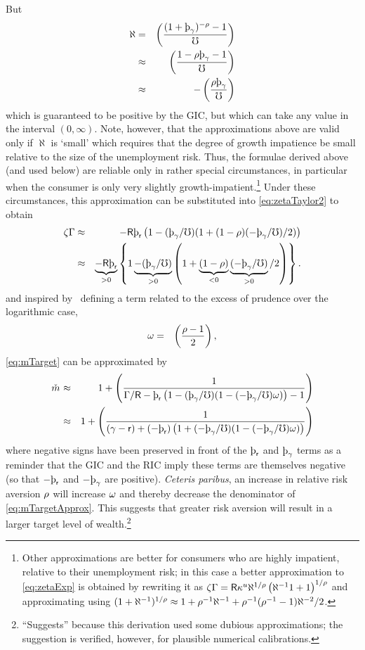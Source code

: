 \message{ !name(TractableBufferStock.tex)}\documentclass{handout}
\begin{document}
But
\begin{eqnarray}
  \label{eq:hatpi}
  \aleph & = & \left(\frac{(1+\patpGro)^{-\CRRA}-1}{\urate}\right)
\\ & \approx & \left(\frac{1- \CRRA \patpGro-1}{\urate}\right)
\\ & \approx & -\left(\frac{\CRRA \patpGro}{\urate}\right)
\end{eqnarray}
which is guaranteed to be positive by the GIC, but which can take any value in the interval $(0,\infty)$.  Note, however, that the approximations above are valid only if $\aleph$ is `small' which requires that the degree of growth impatience be small relative to the size of the unemployment risk.  Thus, the formulae derived above (and used below) are reliable only in rather special circumstances, in particular when the consumer is only very slightly growth-impatient.\footnote{Other approximations are better for consumers who are highly impatient, relative to their unemployment risk; in this case a better approximation to \eqref{eq:zetaExp} is obtained by rewriting it as $\zeta\Gamma = \mathsf{R} \kappa^{u} \aleph^{1/\rho} \left(\aleph^{-1}1+1\right)^{1/\rho}$ and approximating using $(1+\aleph^{-1})^{1/\rho} \approx 1 + \rho^{-1}\aleph^{-1}+\rho^{-1}(\rho^{-1}-1)\aleph^{-2}/2$.}  Under these circumstances, this approximation can be substituted into \eqref{eq:zetaTaylor2} to obtain
\begin{eqnarray}
  \zeta\PGro & \approx &  -\Rfree \patr \left(1-(\patpGro/\urate)(1+(1-\CRRA)(-\patpGro/\urate)/2)\right)
\\ & \approx & \underbrace{-\Rfree \patr}_{>0} \left\{1\underbrace{-(\patpGro/\urate)}_{>0}\left(1+\underbrace{(1-\CRRA)}_{<0}\underbrace{(-\patpGro/\urate)}_{>0}/2\right)\right\} \label{eq:zetaGammaApprox}
.
\end{eqnarray}
and inspired by~\cite{kimball:smallandlarge} defining a term related to the excess of prudence
over the logarithmic case,
\begin{eqnarray}
  \omega & = & \left(\frac{\rho-1}{2}\right),
\end{eqnarray}
\eqref{eq:mTarget} can be approximated by
\begin{eqnarray}
 \mTarg^{\null} & \approx & 1 + \left(\frac{1}{\PGro/\Rfree-\patr \left(1-(\patpGro/\urate)(1-(-\patpGro/\urate)\prudEx) \right)-1}\right)
\\ & \approx & 1 + \left(\frac{1}{(\pGro-\rfree)+(-\patr) \left(1+(-\patpGro/\urate)(1-(-\patpGro/\urate)\prudEx)\right)}\right)
\label{eq:mTargetApprox}
\end{eqnarray}
where negative signs have been preserved in front of the $\patr$ and $\patpGro$ terms as a reminder that
the GIC and the RIC imply these terms are themselves negative (so that $-\patr$ and $-\patpGro$ are positive).
{\it Ceteris paribus}, an increase in relative risk aversion $\rho$ will increase $\omega$ and thereby decrease the denominator of \eqref{eq:mTargetApprox}.  This suggests that
greater risk aversion will result in a larger target level of wealth.\footnote{``Suggests'' because
this derivation used some dubious approximations; the suggestion is verified, however, for
plausible numerical calibrations.}
\end{document}
